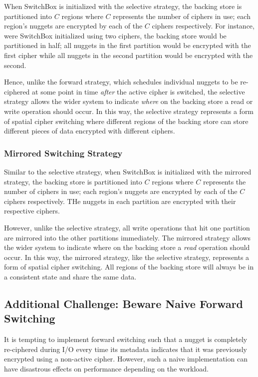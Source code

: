 When SwitchBox is initialized with the selective strategy, the backing store is
partitioned into $C$ regions where $C$ represents the number of ciphers in use;
each region's nuggets are encrypted by each of the $C$ ciphers respectively. For
instance, were SwitchBox initialized using two ciphers, the backing store would
be partitioned in half; all nuggets in the first partition would be encrypted
with the first cipher while all nuggets in the second partition would be
encrypted with the second.

Hence, unlike the forward strategy, which schedules individual nuggets to be
re-ciphered at some point in time \emph{after} the active cipher is switched,
the selective strategy allows the wider system to indicate \emph{where} on the
backing store a read or write operation should occur. In this way, the selective
strategy represents a form of spatial cipher switching where different regions
of the backing store can store different pieces of data encrypted with different
ciphers.

\subsubsection{Mirrored Switching Strategy}

Similar to the selective strategy, when SwitchBox is initialized with the
mirrored strategy, the backing store is partitioned into $C$ regions where $C$
represents the number of ciphers in use; each region's nuggets are encrypted by
each of the $C$ ciphers respectively. THe nuggets in each partition are
encrypted with their respective ciphers.

However, unlike the selective strategy, all write operations that hit one
partition are mirrored into the other partitions immediately. The mirrored
strategy allows the wider system to indicate where on the backing store a
\emph{read} operation should occur. In this way, the mirrored strategy, like the
selective strategy, represents a form of spatial cipher switching. All regions
of the backing store will always be in a consistent state and share the same
data.

\subsection{Additional Challenge: Beware Naive Forward Switching}

It is tempting to implement forward switching such that a nugget is completely
re-ciphered during I/O every time its metadata indicates that it was previously
encrypted using a non-active cipher. However, such a naive implementation can
have disastrous effects on performance depending on the workload.

